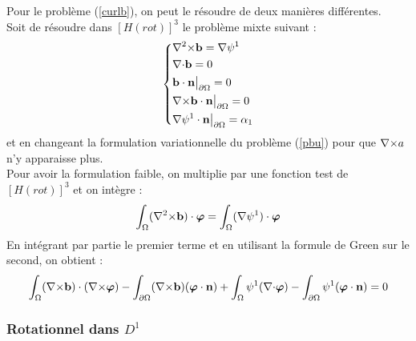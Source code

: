 Pour le problème (\ref{curlb}), on peut le résoudre de deux manières différentes.\\
Soit de résoudre dans $[H(rot)]^3$ le problème mixte suivant : 
\begin{equation}
\label{pbbcurl}
\left\{
\begin{aligned}
&{\nabla^2\times} \mathbf{b} = {\nabla}\psi^1\\
&{\nabla\cdot} \mathbf{b} = 0\\
&\mathbf{b}\cdot \mathbf{n}{\big\rvert_{\partial\Omega}} = 0\\
&{\nabla\times} \mathbf{b}\cdot \mathbf{n}{\big\rvert_{\partial\Omega}} = 0\\
&{\nabla}\psi^1\cdot \mathbf{n}{\big\rvert_{\partial\Omega}} = \alpha_1
\end{aligned}
\right.
\end{equation}
et en changeant la formulation variationnelle du problème (\ref{pbu}) pour que ${\nabla\times} a$ n'y apparaisse plus.\\
Pour avoir la formulation faible, on multiplie par une fonction test de $[H(rot)]^3$ et on intègre :
\[
\int_\Omega ({\nabla^2\times} \mathbf{b})\cdot\bm{\varphi} = \int_\Omega ({\nabla}\psi^1)\cdot\bm{\varphi}
\]
En intégrant par partie le premier terme et en utilisant la formule de Green sur le second, on obtient :
\begin{equation}
\label{fvbcurl}
\int_\Omega ({\nabla\times} \mathbf{b})\cdot({\nabla\times}\bm{\varphi}) - \int_{\partial\Omega} ({\nabla\times} \mathbf{b})(\bm{\varphi}\cdot \mathbf{n}) + \int_\Omega \psi^1({\nabla\cdot}\bm{\varphi}) - \int_{\partial\Omega} \psi^1(\bm{\varphi}\cdot \mathbf{n}) = 0
\end{equation}

\subsubsection{Rotationnel dans $D^1$}

